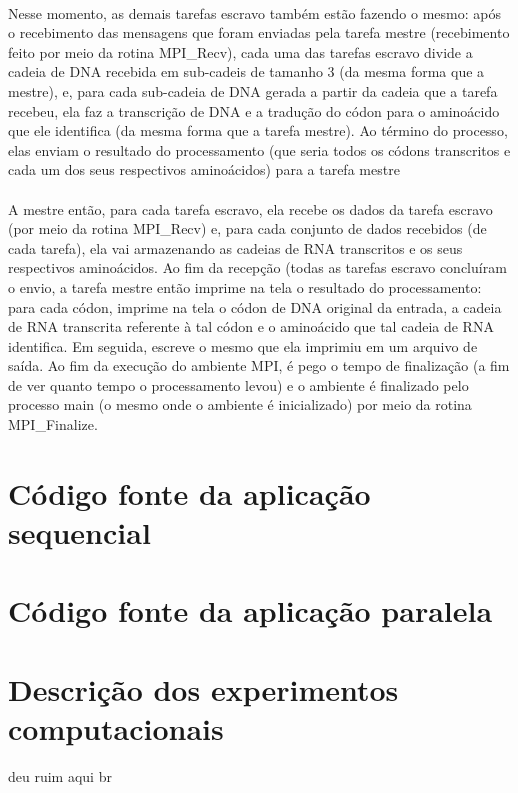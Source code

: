 \documentclass[a4paper,10pt]{article}
\begin{document}
\paragraph{}Nesse momento, as demais tarefas escravo também estão fazendo o mesmo: após o recebimento das mensagens que foram enviadas pela tarefa mestre (recebimento feito por meio da rotina MPI\_Recv), cada uma das tarefas escravo divide a cadeia de DNA recebida em sub-cadeis de tamanho 3 (da mesma forma que a mestre), e, para cada sub-cadeia de DNA gerada a partir da cadeia que a tarefa recebeu, ela faz a transcrição de DNA e a tradução do códon para o aminoácido que ele identifica (da mesma forma que a tarefa mestre). Ao término do processo, elas enviam o resultado do processamento (que seria todos os códons transcritos e cada um dos seus respectivos aminoácidos) para a tarefa mestre\\
\paragraph{} A mestre então, para cada tarefa escravo, ela recebe os dados da tarefa escravo (por meio da rotina MPI\_Recv) e, para cada conjunto de dados recebidos (de cada tarefa), ela vai armazenando as cadeias de RNA transcritos e os seus respectivos aminoácidos. Ao fim da recepção (todas as tarefas escravo concluíram o envio, a tarefa mestre então imprime na tela o resultado do processamento: para cada códon, imprime na tela o códon de DNA original da entrada, a cadeia de RNA transcrita referente à tal códon e o aminoácido que tal cadeia de RNA identifica. Em seguida, escreve o mesmo que ela imprimiu em um arquivo de saída. Ao fim da execução do ambiente MPI, é pego o tempo de finalização (a fim de ver quanto tempo o processamento levou) e o ambiente é finalizado pelo processo main (o mesmo onde o ambiente é inicializado) por meio da rotina MPI\_Finalize.\\

\section{Código fonte da aplicação sequencial}
\section{Código fonte da aplicação paralela}

\section{Descrição dos experimentos computacionais}
deu ruim aqui br



\end{document}
